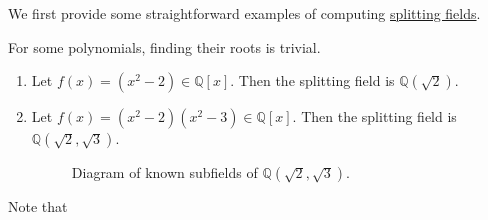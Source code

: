   We first provide some straightforward examples of computing \hyperref[def:splitting-field]{splitting fields}. 

  \begin{example}
    \label{ex:straightforward-computation-of-splitting-fields}
    For some polynomials, finding their roots is trivial. 
    \begin{enumerate}
      \item Let $f(x) = (x^2 - 2) \in \mathbb{Q}[x]$. Then the splitting field is $\mathbb{Q}(\sqrt{2})$. 

      \item Let $f(x) = (x^2 - 2)(x^2 - 3) \in \mathbb{Q}[x]$. Then the splitting field is $\mathbb{Q}(\sqrt{2}, \sqrt{3})$. 
        
      \begin{figure}[H]
        \centering 
        \caption{Diagram of known subfields of $\mathbb{Q}(\sqrt{2}, \sqrt{3})$.} 
      \end{figure}
    \end{enumerate}
    Note that 
  \end{example}

